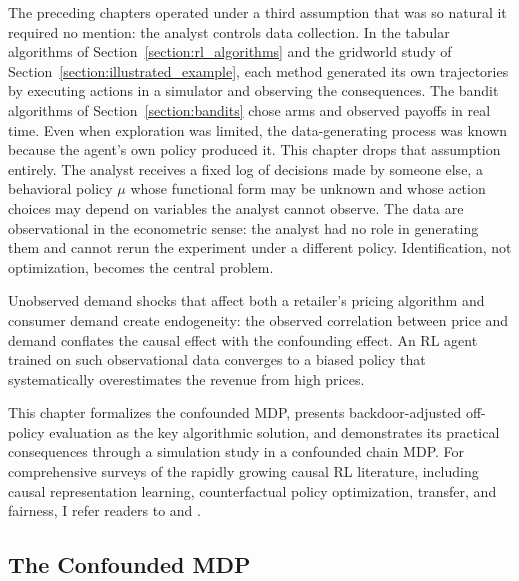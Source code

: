 The preceding chapters operated under a third assumption that was so natural it required no mention: the analyst controls data collection. In the tabular algorithms of Section~\ref{section:rl_algorithms} and the gridworld study of Section~\ref{section:illustrated_example}, each method generated its own trajectories by executing actions in a simulator and observing the consequences. The bandit algorithms of Section~\ref{section:bandits} chose arms and observed payoffs in real time. Even when exploration was limited, the data-generating process was known because the agent's own policy produced it. This chapter drops that assumption entirely. The analyst receives a fixed log of decisions made by someone else, a behavioral policy $\mu$ whose functional form may be unknown and whose action choices may depend on variables the analyst cannot observe. The data are observational in the econometric sense: the analyst had no role in generating them and cannot rerun the experiment under a different policy. Identification, not optimization, becomes the central problem.

Unobserved demand shocks that affect both a retailer's pricing algorithm and consumer demand create endogeneity: the observed correlation between price and demand conflates the causal effect with the confounding effect. An RL agent trained on such observational data converges to a biased policy that systematically overestimates the revenue from high prices.

This chapter formalizes the confounded MDP, presents backdoor-adjusted off-policy evaluation as the key algorithmic solution, and demonstrates its practical consequences through a simulation study in a confounded chain MDP. For comprehensive surveys of the rapidly growing causal RL literature, including causal representation learning, counterfactual policy optimization, transfer, and fairness, I refer readers to \citet{deng2023causal} and \citet{dacostacunha2025unifying}.

\subsection{The Confounded MDP}
\label{subsec:confounded_mdp}

